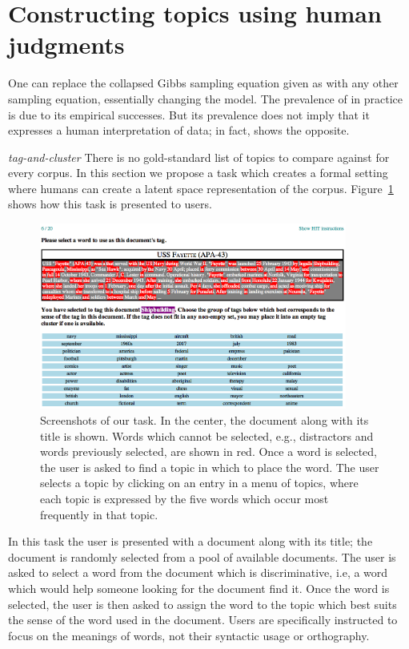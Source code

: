 \section{Constructing topics using human judgments}
\label{sec:tasks}
One can replace the collapsed Gibbs sampling equation given as
 with any other sampling equation, essentially
changing the model.  The prevalence of  in practice
is due to its empirical successes.  But its prevalence does not imply
that it expresses a human interpretation of data; in fact,
\cite{Chang:2009fk} shows the opposite.

\emph{tag-and-cluster}
There is no gold-standard list of topics to compare against for every
corpus.  In this section we propose a task which creates a formal
setting where humans can create a latent space representation of the
corpus.  Figure~\ref{fig:screenshot} shows how this task is presented
to users.

\begin{figure}[t]
\centering
\includegraphics[width=0.90\textwidth]{figures/screenshots.png}
\caption{Screenshots of our task.  In the center, the document along
  with its title is shown.  Words which cannot be selected, e.g.,
  distractors and words previously selected, are shown in red.  Once a
  word is selected, the user is asked to find a topic in which to
  place the word.  The user selects a topic by clicking on an entry in
  a menu of topics, where each topic is expressed by the five words
  which occur most frequently in that topic.}
\label{fig:screenshot}
\end{figure}

In this task the user is presented with a document along with its
title; the document is randomly selected from a pool of available
documents.  The user is asked to select a word from the document which
is discriminative, i.e, a word which would help someone looking for
the document find it.  Once the word is selected, the user is then
asked to assign the word to the topic which best suits the sense of
the word used in the document.  Users are specifically instructed to
focus on the meanings of words, not their syntactic usage or
orthography.  

